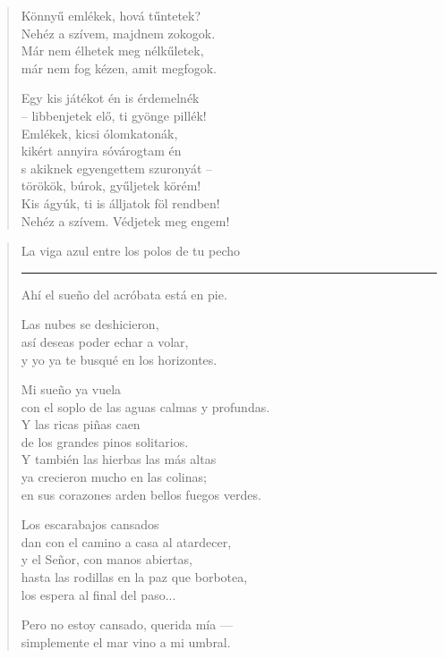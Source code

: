 \documentclass[11pt]{book}
\newcommand*{\centeredornament}{\centerline{\pgfornament[width=6cm]{88}}}
\begin{document}
\newpage

\vspace*{-15mm}
\centeredornament



\begin{verse}
  Könnyű emlékek, hová tűntetek? \\
  Nehéz a szívem, majdnem zokogok. \\
  Már nem élhetek meg nélkűletek, \\
  már nem fog kézen, amit megfogok.

  Egy kis játékot én is érdemelnék \\
  -- libbenjetek elő, ti gyönge pillék! \\
  Emlékek, kicsi ólomkatonák, \\
  kikért annyira sóvárogtam én \\
  s akiknek egyengettem szuronyát -- \\
  törökök, búrok, gyűljetek körém! \\
  Kis ágyúk, ti is álljatok föl rendben! \\
  Nehéz a szívem. Védjetek meg engem!
\end{verse}

\newpage

\vspace*{-15mm}
\centeredornament



\begin{verse}
  La viga azul entre los polos de tu pecho \\
  \rule[0.2em]{3em}{0.5pt} Ahí el sueño del acróbata está en pie.\hspace*{-1mm}

  Las nubes se deshicieron, \\
  así deseas poder echar a volar, \\
  y yo ya te busqué en los horizontes.

  Mi sueño ya vuela \\
  con el soplo de las aguas calmas y profundas. \\
  Y las ricas piñas caen \\
  de los grandes pinos solitarios. \\
  Y también las hierbas las más altas \\
  ya crecieron mucho en las colinas; \\
  en sus corazones arden bellos fuegos verdes.

  Los escarabajos cansados \\
  dan con el camino a casa al atardecer, \\
  y el Señor, con manos abiertas, \\
  hasta las rodillas en la paz que borbotea, \\
  los espera al final del paso...

  Pero no estoy cansado, querida mía --- \\
  simplemente el mar vino a mi umbral.
\end{verse}
\end{document}
